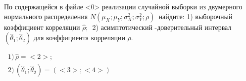 \documentclass{article}%
\begin{document}
\begin{problem}
По содержащейся в файле <0> реализации случайной выборки
из двумерного нормального распределения
\(N(\mu_X;\mu_Y;\sigma_X^2;\sigma_Y^2;\rho)\,\) найдите:
1) выборочный коэффициент корреляции \(\widehat\rho;\,\)
2) асимптотический \(<1>\text{-}\)доверительный интервал
\((\widehat\theta_1;\widehat\theta_2)\)
для коэффициента корреляции
\(\rho\).
\end{problem}

\begin{solution*}
$\,
\begin{array}{l}
1)\,\widehat\rho=<2>;\\
2)\,(\widehat\theta_1;\widehat\theta_2)=(<3>;<4>)
\end{array}
$
\end{solution*}
\end{document}
